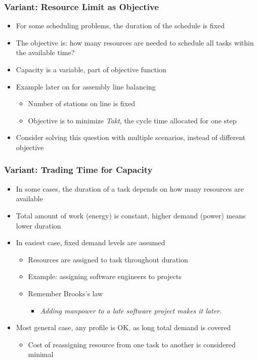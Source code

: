 \begin{frame}
\frametitle{Variant: Resource Limit as Objective \navail}
\begin{itemize}
\item For some scheduling problems, the duration of the schedule is fixed
\item The objective is: how many resources are needed to schedule all tasks within the available time?
\item Capacity is a variable, part of objective function
\item Example later on for assembly line balancing
\begin{itemize}
\item Number of stations on line is fixed
\item Objective is to minimize \emph{Takt}, the cycle time allocated for one step
\end{itemize}
\item Consider solving this question with multiple scenarios, instead of different objective
\end{itemize}
\end{frame}



\begin{frame}
\frametitle{Variant: Trading Time for Capacity \navail}
\begin{itemize}
\item In some cases, the duration of a task depends on how many resources are available
\item Total amount of work (energy) is constant, higher demand (power) means lower duration
\item In easiest case, fixed demand levels are assumed
\begin{itemize}
\item Resources are assigned to task throughout duration
\item Example: assigning software engineers to projects
\item Remember Brooks's law
\begin{itemize}
\item \emph{Adding manpower to a late software project makes it later.}
\end{itemize}

\end{itemize}

\item Most general case, any profile is OK, as long total demand is covered
\begin{itemize}
\item Cost of reassigning resource from one task to another is considered minimal
\end{itemize}

\end{itemize}
\end{frame}



